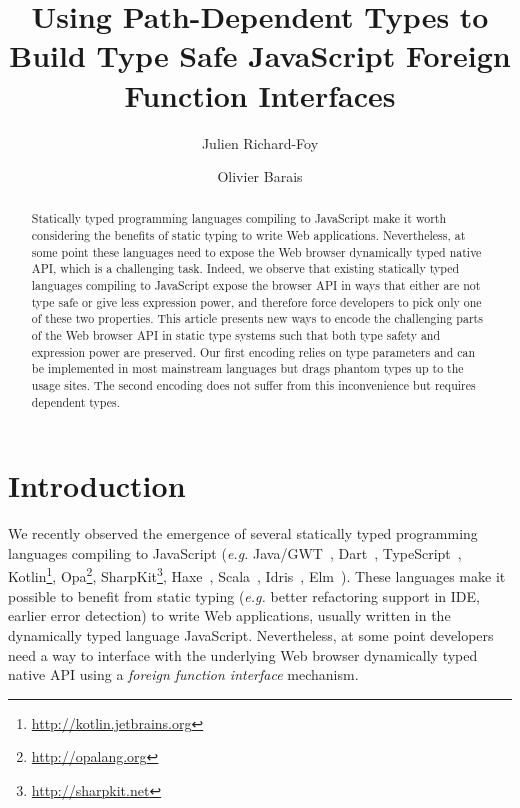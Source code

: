 \documentclass{llncs}
\begin{document}
\renewcommand{\thelstlisting}{\arabic{lstlisting}}

 \title{Using Path-Dependent Types to Build Type Safe JavaScript Foreign Function Interfaces}

 \author{Julien Richard-Foy \and Olivier Barais}



 \maketitle

\begin{abstract}
Statically typed programming languages compiling to JavaScript make it worth considering the benefits of static typing to write Web applications. Nevertheless, at some point these languages need to expose the Web browser dynamically typed native API, which is a challenging task. Indeed, we observe that existing statically typed languages compiling to JavaScript expose the browser API in ways that either are not type safe or give less expression power, and therefore force developers to pick only one of these two properties. This article presents new ways to encode the challenging parts of the Web browser API in static type systems such that both type safety and expression power are preserved. Our first encoding relies on type parameters and can be implemented in most mainstream languages but drags phantom types up to the usage sites. The second encoding does not suffer from this inconvenience but requires dependent types.
\end{abstract}

\section{Introduction}

We recently observed the emergence of several statically typed programming languages compiling to JavaScript (\emph{e.g.} Java/GWT~\cite{Kereki09_GWT}, Dart~\cite{Griffith11_Dart}, TypeScript~\cite{fenton2012typescript}, Kotlin\footnote{\href{http://kotlin.jetbrains.org}{http://kotlin.jetbrains.org}}, Opa\footnote{\href{http://opalang.org}{http://opalang.org}}, SharpKit\footnote{\href{http://sharpkit.net}{http://sharpkit.net}}, Haxe~\cite{Cannasse08_HaXe}, Scala~\cite{Doeraene13_ScalaJs}, Idris~\cite{Brady13_Idris}, Elm~\cite{czaplicki2012elm}). These languages make it possible to benefit from static typing (\emph{e.g.} better refactoring support in IDE, earlier error detection) to write Web applications, usually written in the dynamically typed language JavaScript. Nevertheless, at some point developers need a way to interface with the underlying Web browser dynamically typed native API using a \emph{foreign function interface} mechanism.
\end{document}

